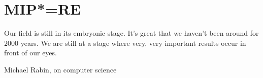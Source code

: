 \section{MIP*=RE}
\epigraph{Our field is still in its embryonic stage. It’s great that we haven’t been around
for 2000 years. We are still at a stage where very, very important results occur
in front of our eyes.}{Michael Rabin, on computer science}
